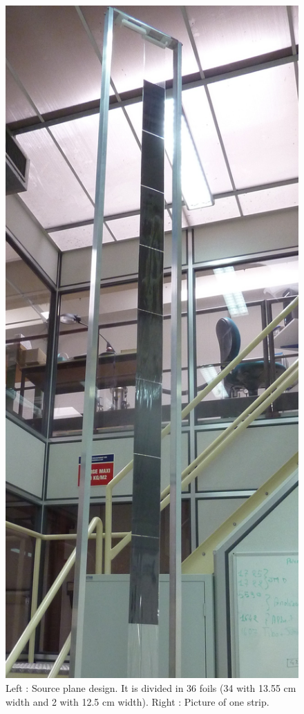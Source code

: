 \documentclass[main.tex]{subfiles}
\begin{document}
\begin{figure}[h!]
\begin{center}
\includegraphics[scale=0.075]{pictures/Chap3/P1090162.JPG}
\caption{Left : Source plane design. It is divided in 36 foils
(34 with 13.55 cm width and 2 with 12.5 cm width). Right : Picture of one strip.} 
\label{SuperNEMOFoils}
\end{center}
\end{figure}
\end{document}
